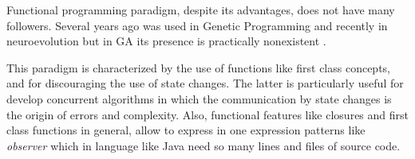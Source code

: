 
Functional programming paradigm, despite its advantages, does not have many followers. Several years ago was used in Genetic Programming \cite{Briggs:2008:FGP:1375341.1375345,Huelsbergen:1996:TSE:1595536.1595579,walsh:1999:AFSFESIHLP} and recently in neuroevolution \cite{Sher2013} but in GA its presence is practically nonexistent \cite{Hawkins:2001:GFG:872017.872197}.

This paradigm is characterized by the use of functions like first class concepts, and for discouraging the use of state changes. The latter is particularly useful for develop concurrent algorithms in which the communication by state changes is the origin of errors and complexity. Also, functional features like closures and first class functions in general, allow to express in one expression patterns like \emph{observer} which in language like Java need so many lines and files of source code.
